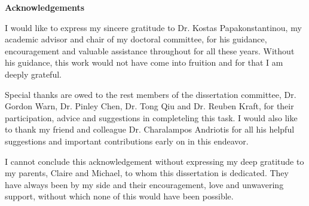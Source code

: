 \clearpage
{}
\begin{center}
\textbf{\Large Acknowledgements}\\
\vspace{\baselineskip}
\end{center}

I would like to express my sincere gratitude to Dr. Kostas Papakonstantinou, my 
academic advisor and chair of my doctoral committee, for his guidance, 
encouragement and valuable assistance throughout for all these years. Without 
his guidance, this work would not have come into fruition and for that I am 
deeply grateful.

Special thanks are owed to the rest members of the dissertation committee, Dr. 
Gordon Warn, Dr. Pinley Chen, Dr. Tong Qiu and Dr. Reuben Kraft, for their 
participation, advice and suggestions in completeling this task. I would also 
like to thank my friend and colleague Dr. Charalampos Andriotis for all his 
helpful suggestions and important contributions early on in this endeavor.

I cannot conclude this acknowledgement without expressing my deep gratitude to 
my parents, Claire and Michael, to whom this dissertation is dedicated. They  
have always been by my side and their encouragement, love and unwavering 
support, without which none of this would have been possible.
\clearpage
